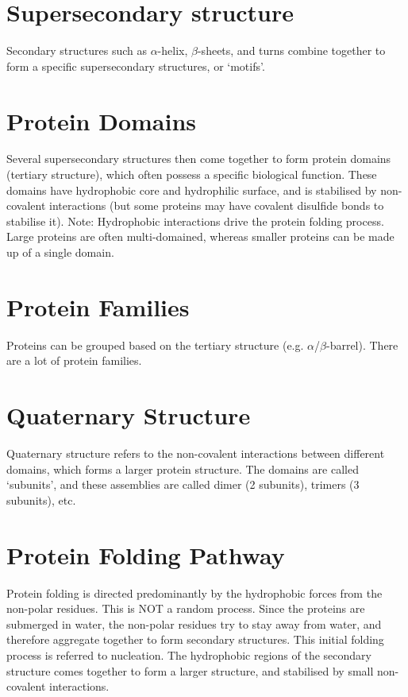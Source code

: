 \section{Supersecondary structure}

Secondary structures such as $\alpha$-helix, $\beta$-sheets, and turns combine together to form a specific supersecondary structures, or `motifs'.

\section{Protein Domains}

Several supersecondary structures then come together to form protein domains (tertiary structure), which often possess a specific biological function.
These domains have hydrophobic core and hydrophilic surface, and is stabilised by non-covalent interactions (but some proteins may have covalent disulfide bonds to stabilise it).
Note: Hydrophobic interactions drive the protein folding process.
Large proteins are often multi-domained, whereas smaller proteins can be made up of a single domain.

\section{Protein Families}

Proteins can be grouped based on the tertiary structure (e.g. $\alpha$/$\beta$-barrel).
There are a lot of protein families.

\section{Quaternary Structure}

Quaternary structure refers to the non-covalent interactions between different domains, which forms a larger protein structure.
The domains are called `subunits', and these assemblies are called dimer (2 subunits), trimers (3 subunits), etc.

\section{Protein Folding Pathway}

Protein folding is directed predominantly by the hydrophobic forces from the non-polar residues.
This is NOT a random process.
Since the proteins are submerged in water, the non-polar residues try to stay away from water, and therefore aggregate together to form secondary structures.
This initial folding process is referred to nucleation.
The hydrophobic regions of the secondary structure comes together to form a larger structure, and stabilised by small non-covalent interactions.

